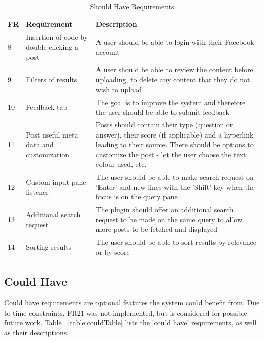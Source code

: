 \documentclass{l4proj}
\begin{document}
\begin{table}[H]
\caption{Should Have Requirements}
\centering
\def\arraystretch{1.5}
\begin{tabular}{p{2cm}p{4cm}p{9cm}}
\hline
FR & Requirement & Description \\
\hline
8 & Insertion of code by double clicking a post & A user should be able to login with their Facebook account \\
9 & Filters of results & A user should be able to review the content before uploading, to delete any content that they do not wish to upload \\
10 & Feedback tab & The goal is to improve the system and therefore the user should be able to submit feedback \\
11 & Post useful meta data and customization & Posts should contain their type (question or answer), their score (if applicable) and a hyperlink leading to their source. There should be options to customize the post - let the user choose the text colour used, etc.\\
12 & Custom input pane listener & The user should be able to make search request on 'Enter' and new lines with the 'Shift' key when the focus is on the query pane\\
13 & Additional search request & The plugin should offer an additional search request to be made on the same query to allow more posts to be fetched and displayed\\
14 & Sorting results & The user should be able to sort results by relevance or by score\\
\hline
\end{tabular}
\label{table:shouldTable}
\end{table}

\subsection{Could Have}
Could have requirements are optional features the system could benefit from. Due to time constraints, FR21 was not implemented, but is considered for possible future work. Table ~\ref{table:couldTable}  lists the 'could have' requirements, as well as their descriptions.
\end{document}
